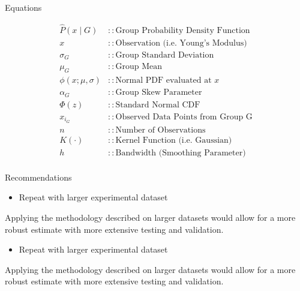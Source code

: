 \documentclass[a0paper,portrait]{baposter}
\begin{document}
\begin{poster}
\begin{posterbox}[name=equations,column=0,below=abstract]{Equations}
\begin{small}
\begin{align*}
  \hat{P}(x \mid G)     &:: \text{Group Probability Density Function}\\
  x                     &:: \text{Observation (i.e. Young's Modulus)}\\
  \sigma_{G}            &:: \text{Group Standard Deviation}\\
  \mu_{G}               &:: \text{Group Mean}\\
  \phi(x; \mu, \sigma)  &:: \text{Normal PDF evaluated at } x \\
  \alpha_G              &:: \text{Group Skew Parameter} \\
  \Phi(z)               &:: \text{Standard Normal CDF} \\
  x_{i_G}               &:: \text{Observed Data Points from Group G}\\
  n                     &:: \text{Number of Observations}\\
  K(\cdot)              &:: \text{Kernel Function (i.e. Gaussian)}\\
  h                     &:: \text{Bandwidth (Smoothing Parameter)}\\
\end{align*}
\end{small}
\end{posterbox}

\begin{posterbox}[name=recommend,column=0,below=equations,above=bottom]{Recommendations}
  \begin{itemize}
    \item Repeat with larger experimental dataset
  \end{itemize}
  {\small\begin{description}
  Applying the methodology described on larger datasets would allow for a more robust estimate with more extensive testing and validation.
  \end{description}}
  \begin{itemize}
    \item Repeat with larger experimental dataset
  \end{itemize}
  {\small\begin{description}
  Applying the methodology described on larger datasets would allow for a more robust estimate with more extensive testing and validation.
  \end{description}}
\end{posterbox}


\end{poster}
\end{document}

